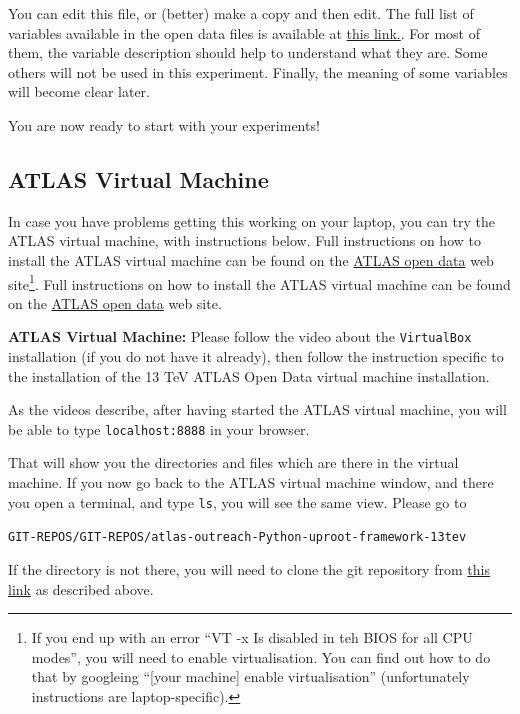 You can edit this file, or (better) make a copy and then edit. The full list of variables available in the open data files is available at \href{http://opendata.atlas.cern/release/2020/documentation/datasets/dataset13.html}{this link.}. For most of them, the variable description should help to understand what they are. Some others will not be used in this experiment. Finally, the meaning of some variables will become clear later. 

You are now ready to start with your experiments!


\subsection{ATLAS Virtual Machine}

 In case you have problems getting this working on your laptop, you can try the ATLAS virtual machine, with instructions below. Full instructions on how to install the ATLAS virtual machine can be found on the \href{http://atlas.cern/resources/opendata}{ATLAS open data} web site\footnote{If you end up with an error ``VT -x Is disabled in teh BIOS for all CPU modes'',  you will need to enable virtualisation. You can find out how to do that by googleing ``[your machine] enable virtualisation'' (unfortunately instructions are laptop-specific).}. Full instructions on how to install the ATLAS virtual machine can be found on the \href{http://atlas.cern/resources/opendata}{ATLAS open data} web site. 

\begin{remark}
\textbf{ATLAS Virtual Machine:} Please follow the video about the \verb|VirtualBox| installation (if you do not have it already), then follow the instruction specific to the installation of the 13 TeV ATLAS Open Data virtual machine installation. 
\end{remark}

As the videos describe, after having started the ATLAS virtual machine, you will be able to type \verb|localhost:8888| in your browser. 

That will show you the directories and files which are there in the virtual machine. If you now go back to the ATLAS virtual machine window, and there you open a terminal, and type \verb|ls|, you will see the same view. Please go to 

\verb|GIT-REPOS/GIT-REPOS/atlas-outreach-Python-uproot-framework-13tev|

If the directory is not there, you will need to clone the git repository from \href{https://github.com/atlas-outreach-data-tools/atlas-outreach-Python-uproot-framework-13tev}{this link} as described above. 



